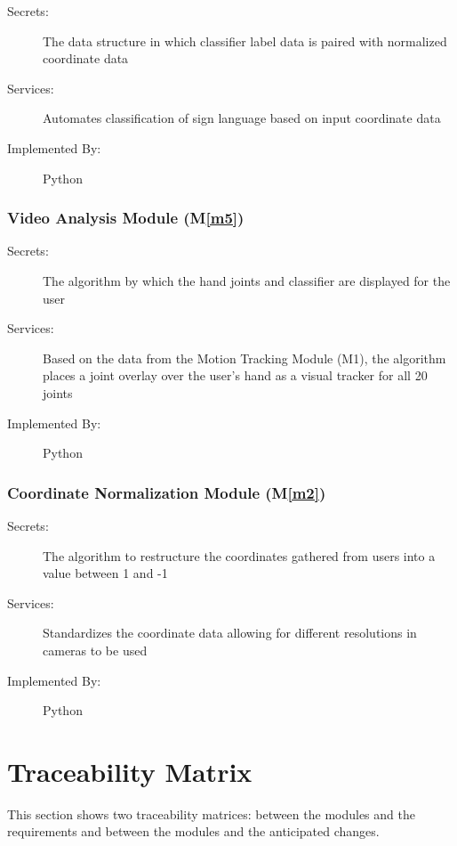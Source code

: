 \documentclass[12pt, titlepage]{article}
\newcommand{\mref}[1]{M\ref{#1}}
\begin{document}
\begin{description}
  \item[Secrets:] The data structure in which classifier label data is paired with normalized coordinate data
  \item[Services:] Automates classification of sign language based on input coordinate data
  \item[Implemented By:] Python
  \end{description}
  

\subsubsection{Video Analysis Module (\mref{m5})}

\begin{description}
  \item[Secrets:] The algorithm by which the hand joints and classifier are displayed for the user
  \item[Services:] Based on the data from the Motion Tracking Module (M1), the algorithm places a joint overlay over the user’s hand as a visual tracker for all 20 joints
  \item[Implemented By:] Python
  \end{description}
  

\subsubsection{Coordinate Normalization Module (\mref{m2})}

\begin{description}
  \item[Secrets:] The algorithm to restructure the coordinates gathered from users into a value between 1 and -1
  \item[Services:] Standardizes the coordinate data allowing for different resolutions in cameras to be used
  \item[Implemented By:] Python
  \end{description}
  

\section{Traceability Matrix} \label{SecTM}

This section shows two traceability matrices: between the modules and the
requirements and between the modules and the anticipated changes.
\end{document}
